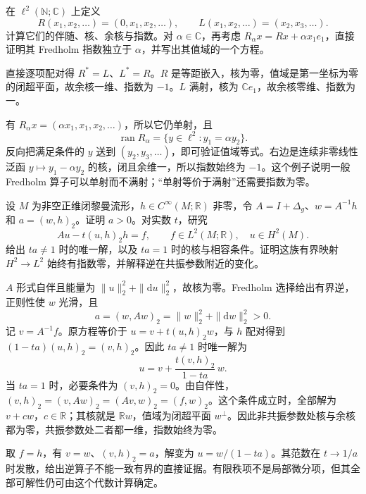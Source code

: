 \begin{exercise}\label{g3:ex:shift-fredholm-index}
	在 \(\ell^2(\mathbb N;\mathbb C)\) 上定义
	\[
		R(x_1,x_2,\ldots)=(0,x_1,x_2,\ldots),\qquad
		L(x_1,x_2,\ldots)=(x_2,x_3,\ldots).
	\]
	计算它们的伴随、核、余核与指数。对 \(\alpha\in\mathbb C\)，再考虑 \(R_\alpha x=Rx+\alpha x_1e_1\)，直接证明其 Fredholm 指数独立于 \(\alpha\)，并写出其值域的一个方程。
\end{exercise}
\begin{solution}
	直接逐项配对得 \(R^*=L\)、\(L^*=R\)。\(R\) 是等距嵌入，核为零，值域是第一坐标为零的闭超平面，故余核一维、指数为 \(-1\)。\(L\) 满射，核为 \(\mathbb C e_1\)，故余核零维、指数为一。

	有 \(R_\alpha x=(\alpha x_1,x_1,x_2,\ldots)\)，所以它仍单射，且
	\[
		\operatorname{ran}R_\alpha
		=\{y\in\ell^2:y_1=\alpha y_2\}.
	\]
	反向把满足条件的 \(y\) 送到 \((y_2,y_3,\ldots)\)，即可验证值域等式。右边是连续非零线性泛函 \(y\mapsto y_1-\alpha y_2\) 的核，闭且余维一，所以指数始终为 \(-1\)。这个例子说明一般 Fredholm 算子可以单射而不满射；“单射等价于满射”还需要指数为零。
\end{solution}

\begin{exercise}\label{g3:ex:rank-one-resonance}
	设 \(M\) 为非空正维闭黎曼流形，\(h\in C^\infty(M;\mathbb R)\) 非零，令 \(A=I+\Delta_g\)、\(w=A^{-1}h\) 和 \(a=(w,h)_2\)。证明 \(a>0\)。对实数 \(t\)，研究
	\[
		A u-t(u,h)_2h=f,\qquad f\in L^2(M;\mathbb R),\quad u\in H^2(M).
	\]
	给出 \(ta\ne1\) 时的唯一解，以及 \(ta=1\) 时的核与相容条件。证明这族有界映射 \(H^2\to L^2\) 始终有指数零，并解释逆在共振参数附近的变化。
\end{exercise}
\begin{solution}
	\(A\) 形式自伴且能量为 \(\|u\|_2^2+\|\mathrm du\|_2^2\)，故核为零。Fredholm 选择给出有界逆，正则性使 \(w\) 光滑，且
	\[
		a=(w,Aw)_2=\|w\|_2^2+\|\mathrm dw\|_2^2>0.
	\]
	记 \(v=A^{-1}f\)。原方程等价于 \(u=v+t(u,h)_2w\)，与 \(h\) 配对得到
	\((1-ta)(u,h)_2=(v,h)_2\)。因此 \(ta\ne1\) 时唯一解为
	\[
		u=v+\frac{t(v,h)_2}{1-ta}\,w.
	\]
	当 \(ta=1\) 时，必要条件为 \((v,h)_2=0\)。由自伴性，\((v,h)_2=(v,Aw)_2=(Av,w)_2=(f,w)_2\)。这个条件成立时，全部解为 \(v+c w\)，\(c\in\mathbb R\)；其核就是 \(\mathbb Rw\)，值域为闭超平面 \(w^\perp\)。因此非共振参数处核与余核都为零，共振参数处二者都一维，指数始终为零。

	取 \(f=h\)，有 \(v=w\)、\((v,h)_2=a\)，解变为 \(u=w/(1-ta)\)。其范数在 \(t\to1/a\) 时发散，给出逆算子不能一致有界的直接证据。有限秩项不是局部微分项，但其全部可解性仍可由这个代数计算确定。
\end{solution}

